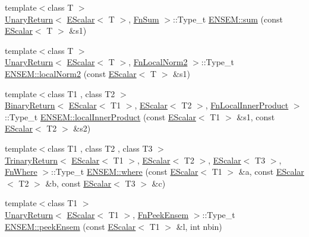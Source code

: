 \begin{DoxyCompactItemize}
{\footnotesize template$<$class T $>$ }\\\mbox{\hyperlink{structENSEM_1_1UnaryReturn}{Unary\+Return}}$<$ \mbox{\hyperlink{classENSEM_1_1EScalar}{E\+Scalar}}$<$ T $>$, \mbox{\hyperlink{structENSEM_1_1FnSum}{Fn\+Sum}} $>$\+::Type\+\_\+t \mbox{\hyperlink{group__escalar_gae544517401e03767c9194bfe3736df37}{E\+N\+S\+E\+M\+::sum}} (const \mbox{\hyperlink{classENSEM_1_1EScalar}{E\+Scalar}}$<$ T $>$ \&s1)
\item 
{\footnotesize template$<$class T $>$ }\\\mbox{\hyperlink{structENSEM_1_1UnaryReturn}{Unary\+Return}}$<$ \mbox{\hyperlink{classENSEM_1_1EScalar}{E\+Scalar}}$<$ T $>$, \mbox{\hyperlink{structENSEM_1_1FnLocalNorm2}{Fn\+Local\+Norm2}} $>$\+::Type\+\_\+t \mbox{\hyperlink{group__escalar_ga5612cd39905e848db7ef691d10437811}{E\+N\+S\+E\+M\+::local\+Norm2}} (const \mbox{\hyperlink{classENSEM_1_1EScalar}{E\+Scalar}}$<$ T $>$ \&s1)
\item 
{\footnotesize template$<$class T1 , class T2 $>$ }\\\mbox{\hyperlink{structENSEM_1_1BinaryReturn}{Binary\+Return}}$<$ \mbox{\hyperlink{classENSEM_1_1EScalar}{E\+Scalar}}$<$ T1 $>$, \mbox{\hyperlink{classENSEM_1_1EScalar}{E\+Scalar}}$<$ T2 $>$, \mbox{\hyperlink{structENSEM_1_1FnLocalInnerProduct}{Fn\+Local\+Inner\+Product}} $>$\+::Type\+\_\+t \mbox{\hyperlink{group__escalar_ga0013b1f4312c45e970912e4df1f55f65}{E\+N\+S\+E\+M\+::local\+Inner\+Product}} (const \mbox{\hyperlink{classENSEM_1_1EScalar}{E\+Scalar}}$<$ T1 $>$ \&s1, const \mbox{\hyperlink{classENSEM_1_1EScalar}{E\+Scalar}}$<$ T2 $>$ \&s2)
\item 
{\footnotesize template$<$class T1 , class T2 , class T3 $>$ }\\\mbox{\hyperlink{structENSEM_1_1TrinaryReturn}{Trinary\+Return}}$<$ \mbox{\hyperlink{classENSEM_1_1EScalar}{E\+Scalar}}$<$ T1 $>$, \mbox{\hyperlink{classENSEM_1_1EScalar}{E\+Scalar}}$<$ T2 $>$, \mbox{\hyperlink{classENSEM_1_1EScalar}{E\+Scalar}}$<$ T3 $>$, \mbox{\hyperlink{structENSEM_1_1FnWhere}{Fn\+Where}} $>$\+::Type\+\_\+t \mbox{\hyperlink{group__escalar_ga1b68bb6fff59089642921a334fde6ef5}{E\+N\+S\+E\+M\+::where}} (const \mbox{\hyperlink{classENSEM_1_1EScalar}{E\+Scalar}}$<$ T1 $>$ \&a, const \mbox{\hyperlink{classENSEM_1_1EScalar}{E\+Scalar}}$<$ T2 $>$ \&b, const \mbox{\hyperlink{classENSEM_1_1EScalar}{E\+Scalar}}$<$ T3 $>$ \&c)
\item 
{\footnotesize template$<$class T1 $>$ }\\\mbox{\hyperlink{structENSEM_1_1UnaryReturn}{Unary\+Return}}$<$ \mbox{\hyperlink{classENSEM_1_1EScalar}{E\+Scalar}}$<$ T1 $>$, \mbox{\hyperlink{structENSEM_1_1FnPeekEnsem}{Fn\+Peek\+Ensem}} $>$\+::Type\+\_\+t \mbox{\hyperlink{group__escalar_ga8fd0207eefa0fd0836dc3f2dffef209e}{E\+N\+S\+E\+M\+::peek\+Ensem}} (const \mbox{\hyperlink{classENSEM_1_1EScalar}{E\+Scalar}}$<$ T1 $>$ \&l, int nbin)

\end{DoxyCompactItemize}
